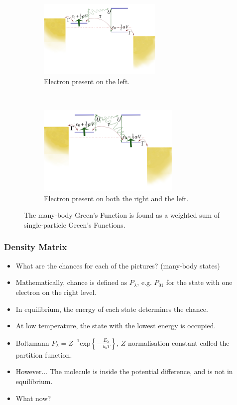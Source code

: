 \begin{frame}
\begin{figure}[!b]
         
        \begin{subfigure}{0.45\textwidth}\centering
            \includegraphics[clip=true,trim=0cm 1cm 0cm 0cm, width=0.65\textwidth]{fig/interacting_schematics2.pdf}
            \caption{Electron present on the left.}
        \end{subfigure}~ 
        \begin{subfigure}{0.45\textwidth}\centering
            \includegraphics[clip=true,trim=0cm 1cm 0cm 0cm, width=0.75\textwidth]{fig/interacting_schematics3.pdf}
            \caption{Electron present on both the right and the left.}
        \end{subfigure}
        \caption{The many-body Green's Function is found as a weighted sum of single-particle Green's Functions.} 
    \end{figure} 
\end{frame} 
\begin{frame}
    \frametitle{Density Matrix}
    \begin{itemize}
        \item What are the chances for each of the pictures? (many-body states)
        \item Mathematically, chance is defined as $P_{\lambda}$, e.g. $P_{01}$ for the state with one electron on the right level.
        \item In equilibrium, the energy of each state determines the chance.
        \item At low temperature, the state with the lowest energy is occupied.
        \item Boltzmann $P_\lambda = Z^{-1} \text{exp}\left\{ - \frac{E_\lambda}{k_b T}\right\}$, $Z$ normalisation constant called the partition function.
        \item However... The molecule is inside the potential difference, and is not in equilibrium.
        \item What now?
    \end{itemize} 
\end{frame}%
